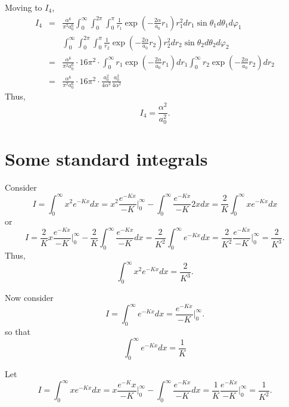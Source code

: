 \documentclass{article}
\numberwithin{equation}{section}
\begin{document}
Moving to $I_4$,
\begin{eqnarray*}
I_4 &=& \frac{\alpha^6}{\pi^2 a_0^6}
\int_0^\infty\int_0^{2\pi}\int_0^\pi
\frac{1}{r_1}\exp\left(-\frac{2\alpha}{a_0}r_1\right)
r_1^2dr_1\sin\theta_1d\theta_1d\varphi_1 \\
 & & 
\int_0^\infty\int_0^{2\pi}\int_0^\pi
\frac{1}{r_2}\exp\left(-\frac{2\alpha}{a_0}r_2\right)
r_2^2dr_2\sin\theta_2d\theta_2d\varphi_2 \\
&=& \frac{\alpha^6}{\pi^2 a_0^6} \cdot 16\pi^2 \cdot
\int_0^\infty r_1\exp\left(-\frac{2\alpha}{a_0}r_1\right)dr_1
\int_0^\infty r_2\exp\left(-\frac{2\alpha}{a_0}r_2\right)dr_2 \\
&=& \frac{\alpha^6}{\pi^2 a_0^6} \cdot 16\pi^2 \cdot
\frac{a_0^2}{4\alpha^2}\frac{a_0^2}{4\alpha^2}
\end{eqnarray*}
Thus,
\begin{equation}\label{s5e75}
I_4 = \frac{\alpha^2}{a_0^2}.
\end{equation}


\section{Some standard integrals}\label{a}
Consider
\[
I = \int_0^\infty x^2 e^{-Kx}dx = x^2\frac{e^{-Kx}}{-K}\Big|_0^\infty -
\int_0^\infty\frac{e^{-Kx}}{-K}2xdx = \frac{2}{K}\int_0^\infty xe^{-Kx}dx
\]
or
\[
I = \frac{2}{K}x\frac{e^{-Kx}}{-K}\Big|_0^\infty - \frac{2}{K}\int_0^\infty
\frac{e^{-Kx}}{-K}dx = \frac{2}{K^2}\int_0^\infty e^{-Kx}dx = 
\frac{2}{K^2}\frac{e^{-Kx}}{-K}\Big|_0^\infty = \frac{2}{K^3}.
\]
Thus,
\begin{equation}\label{a1e1}
\int_0^\infty x^2 e^{-Kx}dx = \frac{2}{K^3}.
\end{equation}

Now consider
\[
I = \int_0^\infty e^{-Kx}dx = \frac{e^{-Kx}}{-K}\Big|_0^\infty.
\]
so that
\begin{equation}\label{a1e2}
\int_0^\infty e^{-Kx}dx = \frac{1}{K}
\end{equation}

Let
\begin{equation}\label{a1e3}
I = \int_0^\infty xe^{-Kx}dx = x\frac{e^{-K}x}{-K}\Big|_0^\infty -
\int_0^\infty\frac{e^{-Kx}}{-K}dx = \frac{1}{K}\frac{e^{-Kx}}{-K}
\Big|_0^\infty = \frac{1}{K^2}.
\end{equation}
\end{document}
